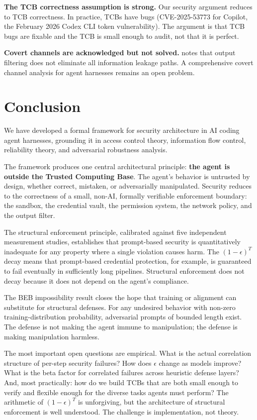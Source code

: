\documentclass[11pt, a4paper, copyright]{googledeepmind}
\begin{document}
\textbf{The TCB correctness assumption is strong.} Our security argument reduces to TCB correctness. In practice, TCBs have bugs (CVE-2025-53773 for Copilot, the February 2026 Codex CLI token vulnerability). The argument is that TCB bugs are fixable and the TCB is small enough to audit, not that it is perfect.

\textbf{Covert channels are acknowledged but not solved.}  notes that output filtering does not eliminate all information leakage paths. A comprehensive covert channel analysis for agent harnesses remains an open problem.


\section{Conclusion}
\label{sec:conclusion}

We have developed a formal framework for security architecture in AI coding agent harnesses, grounding it in access control theory, information flow control, reliability theory, and adversarial robustness analysis.

The framework produces one central architectural principle: \textbf{the agent is outside the Trusted Computing Base}. The agent's behavior is untrusted by design, whether correct, mistaken, or adversarially manipulated. Security reduces to the correctness of a small, non-AI, formally verifiable enforcement boundary: the sandbox, the credential vault, the permission system, the network policy, and the output filter.

The structural enforcement principle, calibrated against five independent measurement studies, establishes that prompt-based security is quantitatively inadequate for any property where a single violation causes harm. The $(1-\epsilon)^T$ decay means that prompt-based credential protection, for example, is guaranteed to fail eventually in sufficiently long pipelines. Structural enforcement does not decay because it does not depend on the agent's compliance.

The BEB impossibility result closes the hope that training or alignment can substitute for structural defenses. For any undesired behavior with non-zero training-distribution probability, adversarial prompts of bounded length exist. The defense is not making the agent immune to manipulation; the defense is making manipulation harmless.

The most important open questions are empirical. What is the actual correlation structure of per-step security failures? How does $\epsilon$ change as models improve? What is the beta factor for correlated failures across heuristic defense layers? And, most practically: how do we build TCBs that are both small enough to verify and flexible enough for the diverse tasks agents must perform? The arithmetic of $(1-\epsilon)^T$ is unforgiving, but the architecture of structural enforcement is well understood. The challenge is implementation, not theory.
\end{document}
